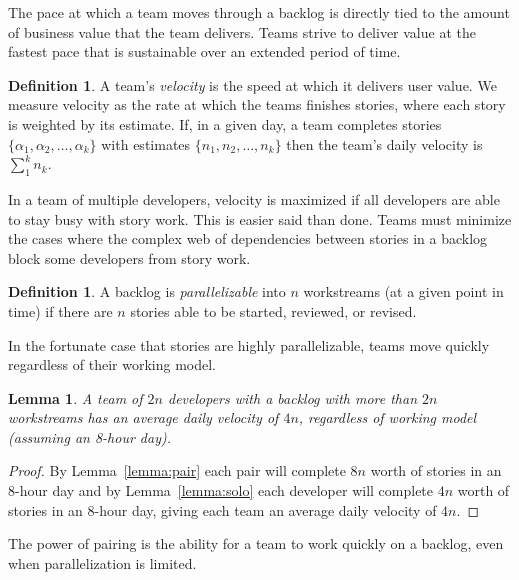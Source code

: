 \documentclass[letterpaper]{article}
\newtheorem{lemma}[theorem]{Lemma}
\theoremstyle{definition}
\newtheorem{definition}[theorem]{Definition}
\begin{document}
    The pace at which a team moves through a backlog is directly tied to the amount of business value that the team
    delivers.
    Teams strive to deliver value at the fastest pace that is sustainable over an extended period of time.

    \begin{definition}
        A team's \textit{velocity} is the speed at which it delivers user value.
        We measure velocity as the rate at which the teams finishes stories, where each story is weighted by its
        estimate.
        If, in a given day, a team completes stories $\{\alpha_1, \alpha_2,\dots,\alpha_k\}$ with estimates
        $\{n_1, n_2,\dots,n_k\}$ then the team's daily velocity is $\sum_1^k n_k$.
    \end{definition}

    In a team of multiple developers, velocity is maximized if all developers are able to stay busy with story work.
    This is easier said than done.
    Teams must minimize the cases where the complex web of dependencies between stories in a backlog block some
    developers from story work.

    \begin{definition}
        A backlog is \textit{parallelizable} into $n$ workstreams (at a given point in time) if there are $n$ stories
        able to be started, reviewed, or revised.
    \end{definition}

    In the fortunate case that stories are highly parallelizable, teams move quickly regardless of their working model.

    \begin{lemma}
        \label{lemma:parallel}
        A team of $2n$ developers with a backlog with more than $2n$ workstreams has an average daily velocity of $4n$,
        regardless of working model (assuming an 8-hour day).
    \end{lemma}
    \begin{proof}
        By Lemma~\ref{lemma:pair} each pair will complete $8n$ worth of stories in an 8-hour day and by
        Lemma~\ref{lemma:solo} each developer will complete $4n$ worth of stories in an 8-hour day, giving each team an
        average daily velocity of $4n$.
    \end{proof}

    The power of pairing is the ability for a team to work quickly on a backlog, even when parallelization is limited.
\end{document}
